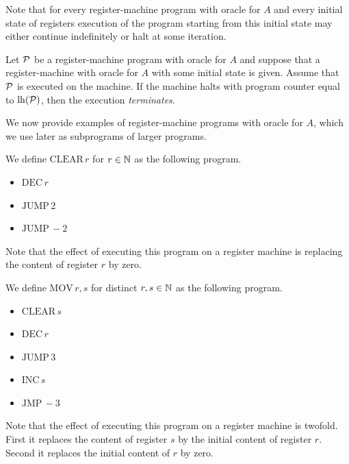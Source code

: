\documentclass[10pt]{amsart}
\begin{document}
\begin{remark}\label{remark:each_execution_either_halts_or_not}
	Note that for every register-machine program with oracle for $A$ and every initial state of registers execution of the program starting from this initial state may either continue indefinitely or halt at some iteration.
\end{remark}

\begin{definition}
	Let ${\mathcal P}$ be a register-machine program with oracle for $A$ and suppose that a register-machine with oracle for $A$ with some initial state is given. Assume that ${\mathcal P}$ is executed on the machine. If the machine halts with program counter equal to $\mathrm{lh}({\mathcal P})$, then the execution \textit{terminates}.
\end{definition}
\noindent
We now provide examples of register-machine programs with oracle for $A$, which we use later as subprograms of larger programs.

\begin{example}\label{example:clear_register_program}
	We define $\mathrm{CLEAR}\,r$ for $r \in {\mathbb N}$ as the following program.
	\begin{itemize}
		\item[] $\mathrm{DEC}\,r$
		\item[] $\mathrm{JUMP}\,2$
		\item[] $\mathrm{JUMP}\,-2$
	\end{itemize}
	Note that the effect of executing this program on a register machine is replacing the content of register $r$ by zero.
\end{example}

\begin{example}\label{example:move_register_program}
	We define $\mathrm{MOV}\,r,s$ for distinct $r,s \in {\mathbb N}$ as the following program.
	\begin{itemize}
		\item[] $\mathrm{CLEAR}\,s$
		\item[] $\mathrm{DEC}\,r$
		\item[] $\mathrm{JUMP}\,3$
		\item[] $\mathrm{INC}\,s$
		\item[] $\mathrm{JMP}\,-3$
	\end{itemize}
	Note that the effect of executing this program on a register machine is twofold. First it replaces the content of register $s$ by the initial content of register $r$. Second it replaces the initial content of $r$ by zero.
\end{example}
\end{document}
